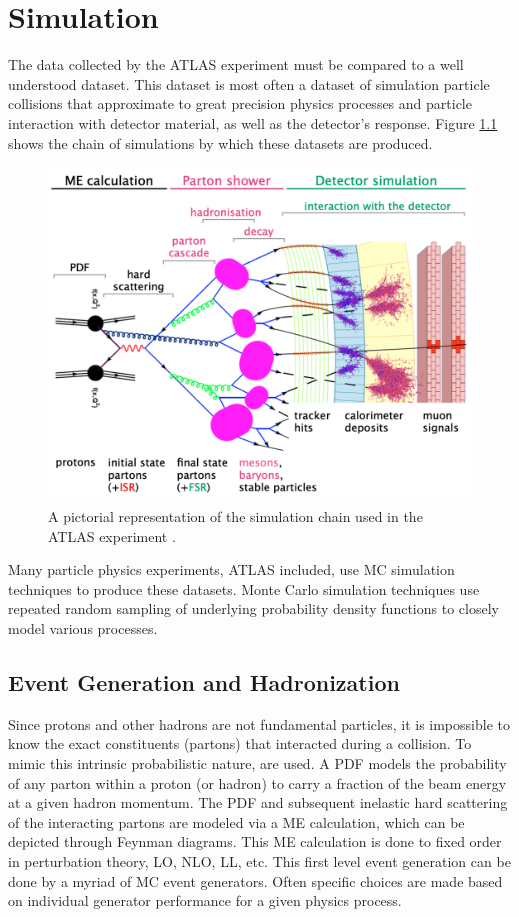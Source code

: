 \chapter{Simulation}\label{chap:sim}
	The data collected by the \gls{ATLAS} experiment must be compared to a well understood dataset. This dataset is most often a dataset of simulation particle collisions that approximate to great precision physics processes and particle interaction with detector material, as well as the detector's response. Figure \ref{fig:simulation} shows the chain of simulations by which these datasets are produced.
	\begin{figure}[!ht]
	\centering
	\includegraphics[width=.95\textwidth,keepaspectratio=true]{chapters/chapter4_simulation/images/Simulation_Chain.png}
	\caption{\label{fig:simulation} A pictorial representation of the simulation chain used in the \gls{ATLAS} experiment \cite{Wanotayaroj:2242196}.}
	\end{figure}
	
	Many particle physics experiments, \gls{ATLAS} included, use \gls{MC} simulation techniques to produce these datasets. Monte Carlo simulation techniques use repeated random sampling of underlying probability density functions to closely model various processes. 

	\section{Event Generation and Hadronization}\label{sec:event-gen}
		Since protons and other hadrons are not fundamental particles, it is impossible to know the exact constituents (partons) that interacted during a collision. To mimic this intrinsic probabilistic nature,  are used. A \gls{PDF} models the probability of any parton within a proton (or hadron) to carry a fraction of the beam energy at a given hadron momentum. The \gls{PDF} and subsequent inelastic hard scattering of the interacting partons are modeled via a \gls{ME} calculation, which can be depicted through Feynman diagrams. This \gls{ME} calculation is done to fixed order in perturbation theory, \gls{LO}, \gls{NLO}, \gls{LL}, etc. This first level event generation can be done by a myriad of \gls{MC} event generators. Often specific choices are made based on individual generator performance for a given physics process.

